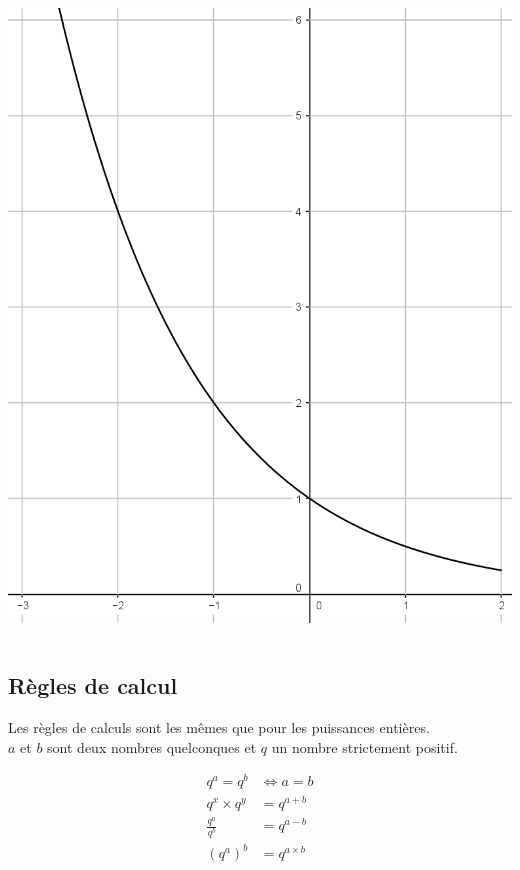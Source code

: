 \documentclass[xcolor={dvipsnames}]{beamer}
\begin{document}
\begin{frame}
\begin{myex}
\begin{columns}{}
\begin{column}{6cm}
			\begin{center}
				\includegraphics[scale=0.2]{var2}
			\end{center}
			
		\end{column}
		
	\end{columns}
\end{myex}

\end{frame}

\subsection{Règles de calcul}

\begin{frame}
	\begin{myprops}
		Les règles de calculs sont les mêmes que pour les puissances entières.\\
		$a$ et $b$ sont deux nombres quelconques et $q$ un nombre strictement positif.
		
		\begin{align*}
		q^a = q^b &\Leftrightarrow a = b\\
		q^x \times q^y &= q^{a+b}\\
		\frac{q^a}{q^b} &= q^{a-b}\\
		(q^a)^b &= q^{a \times b}
		\end{align*}
		\end{myprops}
			
\end{frame}
\end{document}
